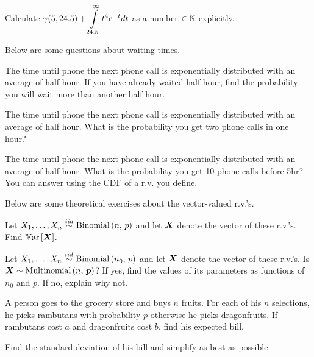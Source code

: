 \documentclass[12pt]{article}
\begin{document}
 Calculate $\gamma(5,24.5) + \displaystyle\int\displaylimits_{24.5}^\infty t^4 e^{-t}dt$ as a number $\in \mathbb{N}$ explicitly. 

\eenum

\problem Below are some questions about waiting times.


\benum

 The time until phone the next phone call is exponentially distributed with an average of half hour. If you have already waited half hour, find the probability you will wait more than another half hour. 

 The time until phone the next phone call is exponentially distributed with an average of half hour. What is the probability you get two phone calls in one hour? 

 The time until phone the next phone call is exponentially distributed with an average of half hour. What is the probability you get 10 phone calls before 5hr? You can answer using the CDF of a r.v. you define.

\eenum

\problem Below are some theoretical exercises about the vector-valued r.v.'s.


\benum
{} Let $\Xoneton \iid \binomial{n}{p}$ and let $\boldsymbol{X}$ denote the vector of these r.v.'s. Find $\mathbb{V}\text{ar}\left[\boldsymbol{X}\right]$. 

 Let $\Xoneton \iid \binomial{n_0}{p}$ and let $\boldsymbol{X}$ denote the vector of these r.v.'s. Is $\boldsymbol{X} \sim \mathrm{Multinomial}\left(n,\,\boldsymbol{p}\right)$? If yes, find the values of its parameters as functions of $n_0$ and $p$. If no, explain why not. 

 A person goes to the grocery store and buys $n$ fruits. For each of his $n$ selections, he picks rambutans with probability $p$ otherwise he picks dragonfruits. If rambutans cost $a$ and dragonfruits cost $b$, find his expected bill. 

 Find the standard deviation of his bill and simplify as best as possible.
\eenum
\end{document}
